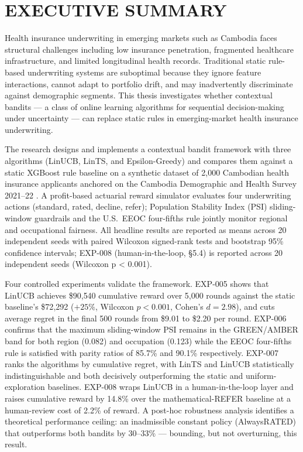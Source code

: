 \chapter*{\centering EXECUTIVE SUMMARY}

\hs Health insurance underwriting in emerging markets such as Cambodia faces structural challenges including low insurance penetration, fragmented healthcare infrastructure, and limited longitudinal health records. Traditional static rule-based underwriting systems are suboptimal because they ignore feature interactions, cannot adapt to portfolio drift, and may inadvertently discriminate against demographic segments. This thesis investigates whether contextual bandits --- a class of online learning algorithms for sequential decision-making under uncertainty --- can replace static rules in emerging-market health insurance underwriting.

The research designs and implements a contextual bandit framework with three algorithms (LinUCB, LinTS, and Epsilon-Greedy) and compares them against a static XGBoost rule baseline on a synthetic dataset of 2{,}000 Cambodian health insurance applicants anchored on the Cambodia Demographic and Health Survey 2021--22 \citep{NIS2023}. A profit-based actuarial reward simulator evaluates four underwriting actions (standard, rated, decline, refer); Population Stability Index (PSI) sliding-window guardrails and the U.S.\ EEOC four-fifths rule jointly monitor regional and occupational fairness. All headline results are reported as means across 20 independent seeds with paired Wilcoxon signed-rank tests and bootstrap 95\% confidence intervals; EXP-008 (human-in-the-loop, §5.4) is reported across 20 independent seeds (Wilcoxon p \textless{} 0.001).

Four controlled experiments validate the framework. EXP-005 shows that LinUCB achieves \$90{,}540 cumulative reward over 5{,}000 rounds against the static baseline's \$72{,}292 ($+25\%$, Wilcoxon $p < 0.001$, Cohen's $d = 2.98$), and cuts average regret in the final 500 rounds from \$9.01 to \$2.20 per round. EXP-006 confirms that the maximum sliding-window PSI remains in the GREEN/AMBER band for both region (0.082) and occupation (0.123) while the EEOC four-fifths rule is satisfied with parity ratios of 85.7\% and 90.1\% respectively. EXP-007 ranks the algorithms by cumulative regret, with LinTS and LinUCB statistically indistinguishable and both decisively outperforming the static and uniform-exploration baselines. EXP-008 wraps LinUCB in a human-in-the-loop layer and raises cumulative reward by 14.8\% over the mathematical-REFER baseline at a human-review cost of 2.2\% of reward. A post-hoc robustness analysis identifies a theoretical performance ceiling: an inadmissible constant policy (AlwaysRATED) that outperforms both bandits by 30--33\% --- bounding, but not overturning, this result.

